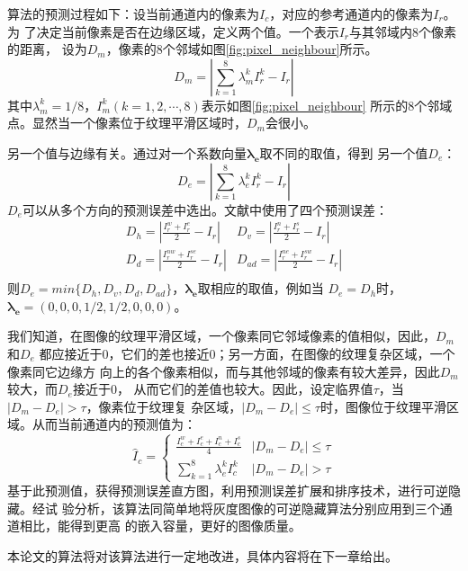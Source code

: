 \par
算法的预测过程如下：设当前通道内的像素为$I_c$，对应的参考通道内的像素为$I_r$。为
了决定当前像素是否在边缘区域，定义两个值。一个表示$I_r$与其邻域内8个像素的距离，
设为$D_m$，像素的8个邻域如图\ref{fig:pixel_neighbour}所示。
\begin{equation}
  D_m=\left|\sum_{k=1}^{8}\lambda_{m}^{k}I_{r}^{k}-I_r\right|
\end{equation}
其中$\lambda_{m}^{k}=1/8$，$I_{m}^{k}(k=1,2,\cdots,8)$表示如图\ref{fig:pixel_neighbour}
所示的8个邻域点。显然当一个像素位于纹理平滑区域时，$D_m$会很小。
\par
另一个值与边缘有关。通过对一个系数向量$\boldsymbol{\lambda_e}$取不同的取值，得到
另一个值$D_e$：
\begin{equation}
  D_e=\left|\sum_{k=1}^{8}\lambda_{e}^{k}I_{r}^{k}-I_r\right|
\end{equation}
$D_e$可以从多个方向的预测误差中选出。文献中使用了四个预测误差：
\begin{equation}
  \begin{array}{ll}
  D_h=\left|\frac{\displaystyle I_r^{w}+I_r^{e}}{\displaystyle 2}-I_r\right| &
  D_v=\left|\frac{\displaystyle I_r^{n}+I_r^{s}}{\displaystyle 2}-I_r\right|\\
  D_d=\left|\frac{\displaystyle I_r^{nw}+I_r^{se}}{\displaystyle 2}-I_r\right| &
  D_{ad}=\left|\frac{\displaystyle I_r^{ne}+I_r^{sw}}{\displaystyle 2}-I_r\right|\\
  \end{array}
\end{equation}
则$D_e=min\{D_h,D_v,D_d,D_{ad}\}$，$\boldsymbol{\lambda_e}$取相应的取值，例如当
$D_e=D_h$时，$\boldsymbol{\lambda_e}=(0,0,0,1/2,1/2,0,0,0)$。
\par
我们知道，在图像的纹理平滑区域，一个像素同它邻域像素的值相似，因此，$D_m$和$D_e$
都应接近于0，它们的差也接近0；另一方面，在图像的纹理复杂区域，一个像素同它边缘方
向上的各个像素相似，而与其他邻域的像素有较大差异，因此$D_m$较大，而$D_e$接近于0，
从而它们的差值也较大。因此，设定临界值$\tau$，当$|D_m-D_e|>\tau$，像素位于纹理复
杂区域，$|D_m-D_e|\le\tau$时，图像位于纹理平滑区域。从而当前通道内的预测值为：
\begin{equation}
  \hat{I}_c=\left\{ \begin{array}{ll}
    \frac{\displaystyle I_c^w+I_c^e+I_c^n+I_c^s}{\displaystyle 4} &
    |D_m-D_e|\le\tau\\
    \sum_{k=1}^{8}\lambda_e^kI_c^k &
    |D_m-D_e|>\tau
  \end{array} \right.
\end{equation}
基于此预测值，获得预测误差直方图，利用预测误差扩展和排序技术，进行可逆隐藏。经试
验分析，该算法同简单地将灰度图像的可逆隐藏算法分别应用到三个通道相比，能得到更高
的嵌入容量，更好的图像质量。
\par
本论文的算法将对该算法进行一定地改进，具体内容将在下一章给出。
